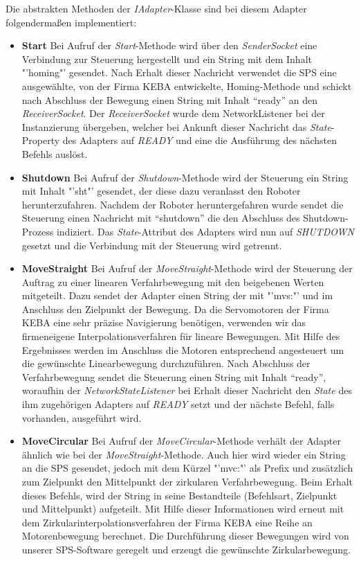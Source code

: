 Die abstrakten Methoden der \textit{IAdapter}-Klasse sind bei diesem Adapter folgendermaßen implementiert:
\begin{itemize}
\item \textbf{Start}
\newline
Bei Aufruf der \textit{Start}-Methode wird über den \textit{SenderSocket} eine Verbindung zur Steuerung hergestellt und ein String mit dem Inhalt "'homing"' gesendet. Nach Erhalt dieser Nachricht verwendet die SPS eine ausgewählte, von der Firma KEBA entwickelte, Homing-Methode und schickt nach Abschluss der Bewegung einen String mit Inhalt “ready” an den \textit{ReceiverSocket}. Der \textit{ReceiverSocket} wurde dem NetworkListener bei der Instanzierung übergeben, welcher bei Ankunft dieser Nachricht das \textit{State}-Property des Adapters auf \textit{READY} und eine die Ausführung des nächsten Befehls auslöst.
\item \textbf{Shutdown}
\newline
Bei Aufruf der \textit{Shutdown}-Methode wird der Steuerung ein String mit Inhalt "'sht"' gesendet, der diese dazu veranlasst den Roboter herunterzufahren. Nachdem der Roboter heruntergefahren wurde sendet die Steuerung einen Nachricht mit “shutdown” die den Abschluss des Shutdown-Prozess indiziert. Das \textit{State}-Attribut des Adapters wird nun auf \textit{SHUTDOWN} gesetzt und die Verbindung mit der Steuerung wird getrennt.
\item \textbf{MoveStraight}
\newline
Bei Aufruf der \textit{MoveStraight}-Methode wird der Steuerung der Auftrag zu einer linearen Verfahrbewegung mit den beigebenen Werten mitgeteilt. Dazu sendet der Adapter einen String der mit "'mvs:"' und im Anschluss den Zielpunkt der Bewegung. Da die Servomotoren der Firma KEBA eine sehr präzise Navigierung benötigen, verwenden wir das firmeneigene Interpolationsverfahren für lineare Bewegungen. Mit Hilfe des Ergebnisses werden im Anschluss die Motoren entsprechend angesteuert um die gewünschte Linearbewegung durchzuführen. Nach Abschluss der Verfahrbewegung sendet die Steuerung einen String mit Inhalt “ready”, woraufhin der \textit{NetworkStateListener} bei Erhalt dieser Nachricht den \textit{State} des ihm zugehörigen Adapters auf \textit{READY} setzt und der nächste Befehl, falls vorhanden, ausgeführt wird.
\item \textbf{MoveCircular}
\newline
Bei Aufruf der \textit{MoveCircular}-Methode verhält der Adapter ähnlich wie bei der \textit{MoveStraight}-Methode. Auch hier wird wieder ein String an die SPS gesendet, jedoch mit dem Kürzel "'mvc:"' als Prefix und zusätzlich zum Zielpunkt den Mittelpunkt der zirkularen Verfahrbewegung. Beim Erhalt dieses Befehls, wird der String in seine Bestandteile (Befehlsart, Zielpunkt und Mittelpunkt) aufgeteilt. Mit Hilfe dieser Informationen wird erneut mit dem Zirkularinterpolationsverfahren der Firma KEBA eine Reihe an Motorenbewegung berechnet. Die Durchführung dieser Bewegungen wird von unserer SPS-Software geregelt und erzeugt die gewünschte Zirkularbewegung. 

\end{itemize}

